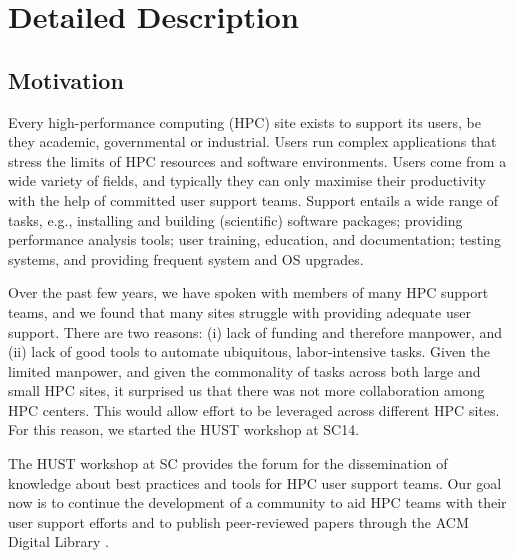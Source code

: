\documentclass[a4paper,10pt]{article}
\begin{document}

\section*{Detailed Description}
\label{sec:detailed}

\subsection*{Motivation}
\label{sec:motivation}

Every high-performance computing (HPC) site exists to support its users,
be they academic, governmental or industrial.  Users run complex applications
that stress the limits of HPC resources and software environments.
Users come from a wide variety of fields,
and typically they can only maximise their productivity with the help of
committed user support teams.  Support entails a wide range
of tasks, e.g., installing and building (scientific) software packages; providing
performance analysis tools; user training, education, and documentation; testing
systems, and providing frequent system and OS upgrades.

Over the past few years, we have spoken with members of many HPC support teams,
and we found that many sites struggle with providing adequate user support.  
There are two reasons: (i) lack of funding and therefore manpower, and
(ii) lack of good tools to automate ubiquitous, labor-intensive tasks.
%
Given the limited manpower, and given the commonality of tasks across both large
and small HPC sites, it surprised us that there was not more collaboration among
HPC centers.  This would allow effort to be leveraged across different HPC sites.
For this reason, we started the HUST workshop at SC14.                                                              

The HUST workshop at SC provides the forum for the 
dissemination of knowledge about best practices and tools for HPC user support teams. 
Our goal now is to continue the development of a community to aid HPC teams 
with their user support efforts and to publish peer-reviewed papers through the ACM Digital Library \cite{H14} \cite{H15} \cite{H16} \cite{H17}
. 
\end{document}
